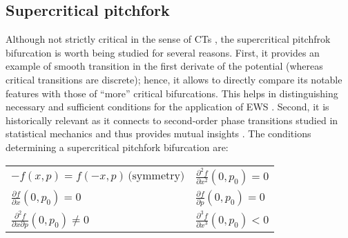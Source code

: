 \tocless\subsection{Supercritical pitchfork}
\label{app:supercr}
Although not strictly critical in the sense of \gls{CT}s \citep{Kuehn2011}, the supercritical pitchfrok bifurcation is worth being studied for several reasons. First, it provides an example of smooth transition in the first derivate of the potential (whereas critical transitions are discrete); hence, it allows to directly compare its notable features with those of ``more'' critical bifurcations. This helps in distinguishing necessary and sufficient conditions for the application of \gls{EWS} \citep{Kefi2013a,Dutta2018}. Second, it is historically relevant as it connects to second-order phase transitions studied in statistical mechanics and thus provides mutual insights \citep{pathria}. The conditions determining a supercritical pitchfork bifurcation are:
\begin{table}[h!]
	\centering
	\begin{tabular}{ll}
		$ -f(x,p)  = f(-x,p)\, \text{(symmetry)}$ & $\frac{\partial^2 f}{\partial x^2}(0,p_0) = 0$   \\
		$\frac{\partial f}{\partial x}(0,p_0) = 0$ &   $\frac{\partial f}{\partial p}(0,p_0) = 0$ \\
		$\frac{\partial^2 f}{\partial x \partial p}(0,p_0)  \neq 0$ &  $\frac{\partial^3 f}{\partial x^3 }(0,p_0)  < 0$
	\end{tabular}
\end{table}

